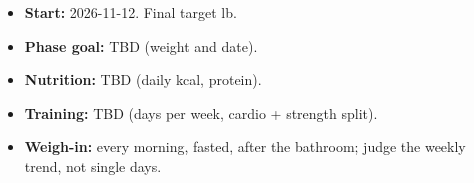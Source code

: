 \begin{itemize}[leftmargin=1.5em]
\item \textbf{Start:} 2026-11-12. Final target \Target{} lb.
\item \textbf{Phase goal:} TBD (weight and date).
\item \textbf{Nutrition:} TBD (daily kcal, protein).
\item \textbf{Training:} TBD (days per week, cardio + strength split).
\item \textbf{Weigh-in:} every morning, fasted, after the bathroom; judge the weekly trend, not single days.
\end{itemize}
